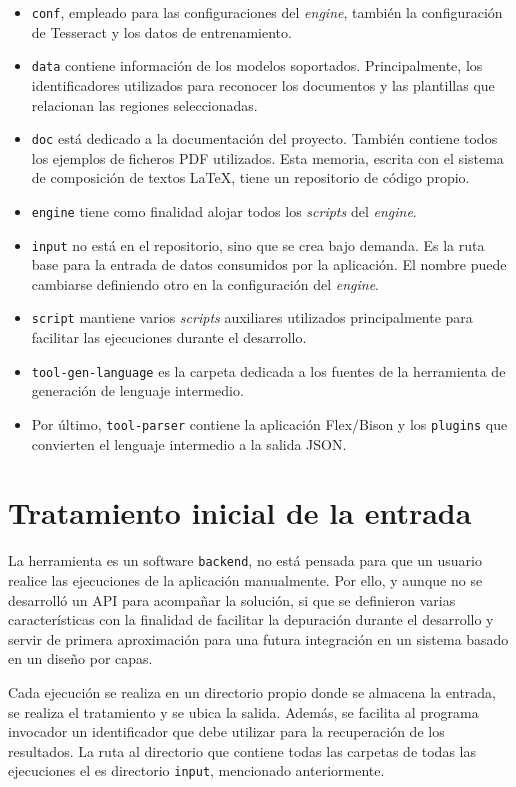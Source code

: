 \begin{itemize}
    \item \verb|conf|, empleado para las configuraciones del \emph{engine}, también la configuración de Tesseract y los datos de entrenamiento.
    \item \verb|data| contiene información de los modelos soportados. Principalmente, los identificadores utilizados para reconocer los documentos y las plantillas que relacionan las regiones seleccionadas.
    \item \verb|doc| está dedicado a la documentación del proyecto. También contiene todos los ejemplos de ficheros PDF utilizados. Esta memoria, escrita con el sistema de composición de textos \LaTeX,  tiene un repositorio de código propio.
    \item \verb|engine| tiene como finalidad alojar todos los \emph{scripts} del \emph{engine}.
    \item \verb|input| no está en el repositorio, sino que se crea bajo demanda. Es la ruta base para la entrada de datos consumidos por la aplicación. El nombre puede cambiarse definiendo otro en la configuración del \emph{engine}.
    \item \verb|script| mantiene varios \emph{scripts} auxiliares utilizados principalmente para facilitar las ejecuciones durante el desarrollo.
    \item \verb|tool-gen-language| es la carpeta dedicada a los fuentes de la herramienta de generación de lenguaje intermedio.
    \item Por último, \verb|tool-parser| contiene la aplicación Flex/Bison y los \verb|plugins| que convierten el lenguaje intermedio a la salida JSON.
\end{itemize}

\section{Tratamiento inicial de la entrada}

La herramienta es un software \verb|backend|, no está pensada para que un usuario realice las ejecuciones de la aplicación manualmente. Por ello, y aunque no se desarrolló un API para acompañar la solución, si que se definieron varias características con la finalidad de facilitar la depuración durante el desarrollo y servir de primera aproximación para una futura integración en un sistema basado en un diseño por capas.

Cada ejecución se realiza en un directorio propio donde se almacena la entrada, se realiza el tratamiento y se ubica la salida. Además, se facilita al programa invocador un identificador que debe utilizar para la recuperación de los resultados. La ruta al directorio que contiene todas las carpetas de todas las ejecuciones el es directorio \verb|input|, mencionado anteriormente.

